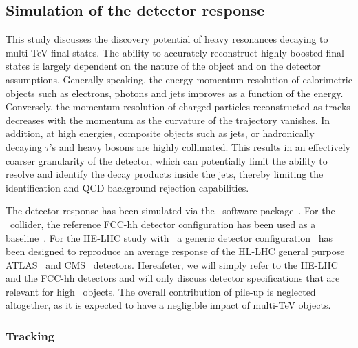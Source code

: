 \subsection{Simulation of the detector response}
\label{subsec:detparam}

This study discusses the discovery potential of heavy resonances decaying to multi-TeV final states. The ability to accurately reconstruct highly boosted final states is largely dependent on the nature of the object and on the detector assumptions. Generally speaking, the energy-momentum resolution of calorimetric objects such as electrons, photons and jets improves as a function of the energy. Conversely, the momentum resolution of charged particles reconstructed as tracks decreases with the momentum as the curvature of the trajectory vanishes. In addition, at high energies, composite objects such as jets, or hadronically decaying $\tau$'s and heavy bosons are highly collimated. This results in an effectively coarser granularity of the detector, which can potentially limit the ability to resolve and identify the decay products inside the jets, thereby limiting the identification and QCD background rejection capabilities. 

The detector response has been simulated via the \delphes{}~software package~\cite{deFavereau:2013fsa}. For the \sqrtsfcc\ collider, the reference FCC-hh detector configuration has been used as a baseline~\cite{cdr_volume3, delphes_card_fcc}. For the HE-LHC study with \sqrtshelhc\, a generic detector configuration~\cite{delphes_card_helhc} has been designed to reproduce an average response of the HL-LHC general purpose ATLAS~\cite{Aad:2008zzm,Capeans:2010jnh} and CMS~\cite{Chatrchyan:2008aa} detectors. Hereafeter, we will simply refer to the HE-LHC and the FCC-hh detectors and will only discuss detector specifications that are relevant for high \pt\ objects. The overall contribution of pile-up is neglected altogether, as it is expected to have a  negligible impact of multi-TeV objects.

\subsubsection{Tracking}
\label{appsub:tracking}

